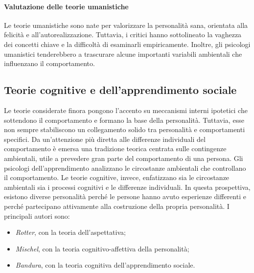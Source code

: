 \documentclass[a4paper]{article}
\begin{document}
\paragraph{Valutazione delle teorie umanistiche}
Le teorie umanistiche sono nate per valorizzare la personalità sana, orientata alla felicità e all'autorealizzazione. Tuttavia, i critici hanno sottolineato la vaghezza dei concetti chiave e la difficoltà di esaminarli empiricamente. Inoltre, gli psicologi umanistici tenderebbero a trascurare alcune importanti variabili ambientali che influenzano il comportamento.
\subsection{Teorie cognitive e dell'apprendimento sociale}
Le teorie considerate finora pongono l'accento su meccanismi interni ipotetici che sottendono il comportamento e formano la base della personalità. Tuttavia, esse non sempre stabiliscono un collegamento solido tra personalità e comportamenti specifici.
Da un'attenzione più diretta alle differenze individuali del comportamento è emersa una tradizione teorica centrata sulle contingenze ambientali, utile a prevedere gran parte del comportamento di una persona.
Gli psicologi dell'apprendimento analizzano le circostanze ambientali che controllano il comportamento.
Le teorie cognitive, invece, enfatizzano sia le circostanze ambientali sia i processi cognitivi e le differenze individuali. In questa prospettiva, esistono diverse personalità perché le persone hanno avuto esperienze differenti e perché partecipano attivamente alla costruzione della propria personalità.
I principali autori sono:
\begin{itemize}
    \item \emph{Rotter}, con la teoria dell'aspettativa;
    \item \emph{Mischel}, con la teoria cognitivo-affettiva della personalità;
    \item \emph{Bandura}, con la teoria cognitiva dell'apprendimento sociale.
\end{itemize}
\end{document}

